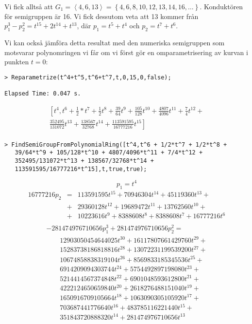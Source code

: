Vi fick alltså att $G_1 = \left<4, 6, 13\right>=\left\{4, 6, 8, 10, 12, 13, 14, 16, \ldots\right\}$. Konduktören för semigruppen är 16. Vi fick dessutom veta att 13 kommer från $p_1^3 - p_2^2 = t^{15} + 2 t^{14} + t^{13}$, där $p_1 = t^5 + t^4$ och $p_2 = t^7 + t^6$.

Vi kan också jämföra detta resultat med den numeriska semigruppen som motsvarar polynomringen vi får om vi först gör en omparametrisering av kurvan i punkten $t = 0$:

\begin{verbatim}
> Reparametrize(t^4+t^5,t^6+t^7,t,0,15,0,false);

Elapsed Time: 0.047 s.
\end{verbatim}
\[
\begin{array}{l}
\left[t^4, t^6+\frac{1}{2}*t^7+\frac{1}{2}t^8+\frac{39}{64}t^9+\frac{105}{128}t^{10}+\frac{4807}{4096}t^{11}+\frac{7}{4}t^{12}+\right.\\[8pt]
\left.\frac{352495}{131072}t^{13}+\frac{138567}{32768}t^{14}+\frac{113591595}{16777216}t^{15}\right]\\
\end{array}
\]

\begin{verbatim}
> FindSemiGroupFromPolynomialRing([t^4,t^6 + 1/2*t^7 + 1/2*t^8 + 
   39/64*t^9 + 105/128*t^10 + 4807/4096*t^11 + 7/4*t^12 + 
   352495/131072*t^13 + 138567/32768*t^14 + 
   113591595/16777216*t^15],t,true,true);
\end{verbatim}

\[p_1=t^4\]
\[
\begin{array}{rcl}
16777216 p_2 & = & 113591595 t^{15} + 70946304 t^{14} + 45119360 t^{13} +\\[3pt]
& + & 29360128 t^{12} + 19689472 t^{11} + 13762560 t^{10} +\\[3pt]
 & + & 10223616 t^9 + 8388608 t^8 + 8388608 t^7 + 16777216 t^6\\[3pt]
\end{array}\]
\[
\begin{array}{l}
-281474976710656 p_1^3 + 281474976710656 p_2^2 =\\[3pt]
\qquad 12903050454644025 t^{30} + 16117807661429760 t^{29} +\\[3pt]
\qquad 15283738186818816 t^{28} + 13072231199539200 t^{27} +\\[3pt]
\qquad 10674858838319104 t^{26} + 8569833185345536 t^{25} +\\[3pt]
\qquad 6914209094303744 t^{24} + 5754492897198080 t^{23} +\\[3pt]
\qquad 5214414567374848 t^{22} + 6901048593612800 t^{21} +\\[3pt]
\qquad 4222124650659840 t^{20} + 2618276488151040 t^{19} +\\[3pt]
\qquad 1650916709105664 t^{18} + 1063090305105920 t^{17} +\\[3pt]
\qquad 703687441776640 t^{16} + 483785116221440 t^{15} +\\[3pt]
\qquad 351843720888320 t^{14} + 281474976710656 t^{13}\\
\end{array}
\]

